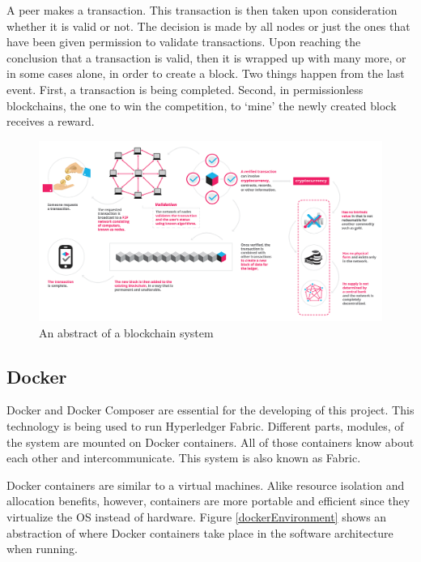 \documentclass[a4paper,11pt]{report}
\begin{document}
A peer makes a transaction. This transaction is then taken upon consideration whether it is valid or not. The decision is made by all nodes or just the ones that have been given permission to validate transactions. Upon reaching the conclusion that a transaction is valid,  then it is wrapped up with many more, or in some cases alone, in order to create a block. Two things happen from the last event. First, a transaction is being completed. Second, in permissionless blockchains, the one to win the competition, to ‘mine’ the newly created block receives a reward. 

\begin{figure}[h]
\centering
  \includegraphics[width=16cm]{infographics0517-01-1.png}
  \caption{An abstract of a blockchain system \cite{whatIsBlockgeeks}}
  \label{blockchainAbstract}
\end{figure}

\subsection{Docker}
\label{docker}
Docker and Docker Composer are essential for the developing of this project. This technology is being used to run Hyperledger Fabric. Different parts, modules, of the system are mounted on Docker containers. All of those containers know about each other and intercommunicate. This system is also known as Fabric.

	Docker containers are similar to a virtual machines. Alike resource isolation and allocation benefits, however, containers are more portable and efficient since they virtualize the OS instead of hardware.\cite{dockerContainer} Figure \ref{dockerEnvironment} shows an abstraction of where Docker containers take place in the software architecture when running.
\end{document}
